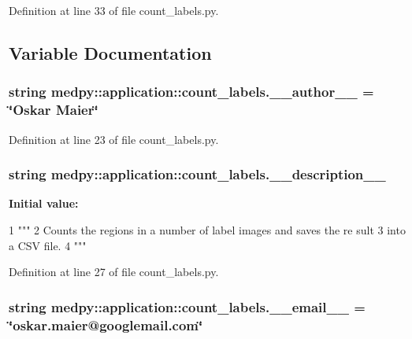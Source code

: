 Definition at line 33 of file count\_\-labels.py.



\subsection{Variable Documentation}
\hypertarget{namespacemedpy_1_1application_1_1count__labels_acb138afc7f8cfbad4f6a0f47f865cafd}{
\subsubsection[{\_\-\_\-author\_\-\_\-}]{\setlength{\rightskip}{0pt plus 5cm}string {\bf medpy::application::count\_\-labels.\_\-\_\-author\_\-\_\-} = \char`\"{}Oskar Maier\char`\"{}}}
\label{namespacemedpy_1_1application_1_1count__labels_acb138afc7f8cfbad4f6a0f47f865cafd}


Definition at line 23 of file count\_\-labels.py.

\hypertarget{namespacemedpy_1_1application_1_1count__labels_aec87be74fa8ec20a1d75bbe4ce65f0b6}{
\subsubsection[{\_\-\_\-description\_\-\_\-}]{\setlength{\rightskip}{0pt plus 5cm}string {\bf medpy::application::count\_\-labels.\_\-\_\-description\_\-\_\-}}}
\label{namespacemedpy_1_1application_1_1count__labels_aec87be74fa8ec20a1d75bbe4ce65f0b6}
{\bfseries Initial value:}
\begin{DoxyCode}
1 """
2                   Counts the regions in a number of label images and saves the re
      sult
3                   into a CSV file.
4                   """
\end{DoxyCode}


Definition at line 27 of file count\_\-labels.py.

\hypertarget{namespacemedpy_1_1application_1_1count__labels_a3f67858472a5f67fe648e469b7b718fa}{
\subsubsection[{\_\-\_\-email\_\-\_\-}]{\setlength{\rightskip}{0pt plus 5cm}string {\bf medpy::application::count\_\-labels.\_\-\_\-email\_\-\_\-} = \char`\"{}oskar.maier@googlemail.com\char`\"{}}}
\label{namespacemedpy_1_1application_1_1count__labels_a3f67858472a5f67fe648e469b7b718fa}


